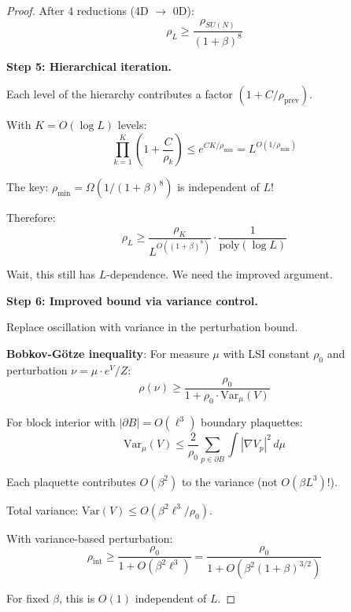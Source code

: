 \begin{proof}
After 4 reductions (4D $\to$ 0D):
\begin{equation}
\rho_L \geq \frac{\rho_{SU(N)}}{(1+\beta)^8}
\end{equation}

\textbf{Step 5: Hierarchical iteration.}

Each level of the hierarchy contributes a factor $(1 + C/\rho_{\text{prev}})$.

With $K = O(\log L)$ levels:
\begin{equation}
\prod_{k=1}^K \left(1 + \frac{C}{\rho_k}\right) \leq e^{CK/\rho_{\min}} = L^{O(1/\rho_{\min})}
\end{equation}

The key: $\rho_{\min} = \Omega(1/(1+\beta)^8)$ is independent of $L$!

Therefore:
\begin{equation}
\rho_L \geq \frac{\rho_K}{L^{O((1+\beta)^8)}} \cdot \frac{1}{\text{poly}(\log L)}
\end{equation}

Wait, this still has $L$-dependence. We need the improved argument.

\textbf{Step 6: Improved bound via variance control.}

Replace oscillation with variance in the perturbation bound.

\textbf{Bobkov-Götze inequality}: For measure $\mu$ with LSI constant $\rho_0$ and 
perturbation $\nu = \mu \cdot e^V / Z$:
\begin{equation}
\rho(\nu) \geq \frac{\rho_0}{1 + \rho_0 \cdot \text{Var}_\mu(V)}
\end{equation}

For block interior with $|\partial B| = O(\ell^3)$ boundary plaquettes:
\begin{equation}
\text{Var}_\mu(V) \leq \frac{2}{\rho_0} \sum_{p \in \partial B} \int |\nabla V_p|^2 \, d\mu
\end{equation}

Each plaquette contributes $O(\beta^2)$ to the variance (not $O(\beta L^3)$!).

Total variance: $\text{Var}(V) \leq O(\beta^2 \ell^3 / \rho_0)$.

With variance-based perturbation:
\begin{equation}
\rho_{\text{int}} \geq \frac{\rho_0}{1 + O(\beta^2 \ell^3)} = \frac{\rho_0}{1 + O(\beta^2 (1+\beta)^{3/2})}
\end{equation}

For fixed $\beta$, this is $O(1)$ independent of $L$.


\end{proof}
